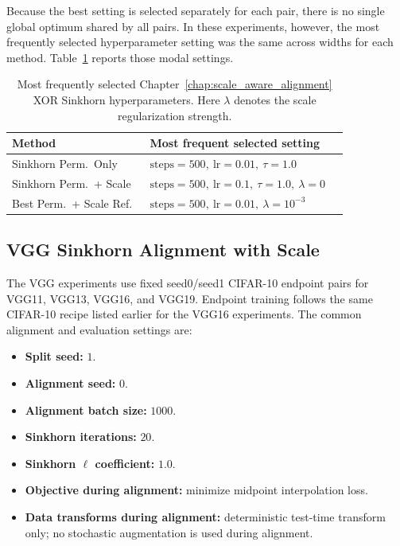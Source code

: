 \documentclass[11pt,a4paper]{report}
\begin{document}
Because the best setting is selected separately for each pair, there is no single global optimum shared by all pairs. In these experiments, however, the most frequently selected hyperparameter setting was the same across widths for each method. Table~\ref{tab:xor_sinkhorn_repro} reports those modal settings.

\begin{table}[H]
\centering
\small
\begin{tabular}{p{0.38\linewidth}p{0.46\linewidth}}
\toprule
\textbf{Method} & \textbf{Most frequent selected setting} \\
\midrule
Sinkhorn Perm.\ Only & \(\text{steps}=500,\ \text{lr}=0.01,\ \tau=1.0\) \\
Sinkhorn Perm.\ + Scale & \(\text{steps}=500,\ \text{lr}=0.1,\ \tau=1.0,\ \lambda=0\) \\
Best Perm.\ + Scale Ref. & \(\text{steps}=500,\ \text{lr}=0.01,\ \lambda=10^{-3}\) \\
\bottomrule
\end{tabular}
\caption{Most frequently selected Chapter~\ref{chap:scale_aware_alignment} XOR Sinkhorn hyperparameters. Here \(\lambda\) denotes the scale regularization strength.}
\label{tab:xor_sinkhorn_repro}
\end{table}

\subsection{VGG Sinkhorn Alignment with Scale}

The VGG experiments use fixed seed0/seed1 CIFAR-10 endpoint pairs for VGG11, VGG13, VGG16, and VGG19. Endpoint training follows the same CIFAR-10 recipe listed earlier for the VGG16 experiments. The common alignment and evaluation settings are:
\begin{itemize}
    \item \textbf{Split seed:} \(1\).
    \item \textbf{Alignment seed:} \(0\).
    \item \textbf{Alignment batch size:} \(1000\).
    \item \textbf{Sinkhorn iterations:} \(20\).
    \item \textbf{Sinkhorn \(\ell\) coefficient:} \(1.0\).
    \item \textbf{Objective during alignment:} minimize midpoint interpolation loss.
    \item \textbf{Data transforms during alignment:} deterministic test-time transform only; no stochastic augmentation is used during alignment.
\end{itemize}
\end{document}
